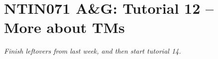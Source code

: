 \documentclass[a4paper,12pt]{amsart}
\begin{document}

\section*{NTIN071 A\&G: Tutorial 12 -- More about TMs}


\medskip


\noindent\emph{Finish leftovers from last week, and then start tutorial 14.}

\medskip
\end{document}
